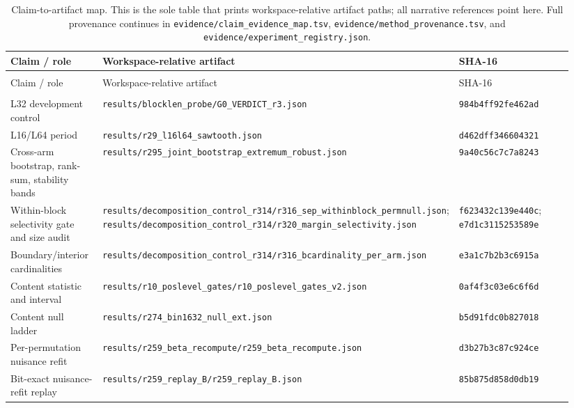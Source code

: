 \documentclass{article}
\newcommand{\ap}[1]{\nolinkurl{#1}}
\begin{document}
\begingroup
\footnotesize
\setlength{\tabcolsep}{2pt}
\setlength{\LTpre}{3pt}
\setlength{\LTpost}{6pt}
\FloatBarrier
\begin{longtable}{@{}>{\raggedright\arraybackslash}p{0.17\linewidth}
                       >{\raggedright\arraybackslash}p{0.53\linewidth}
                       >{\raggedright\arraybackslash}p{0.24\linewidth}@{}}
\caption{Claim-to-artifact map. This is the sole table that prints
workspace-relative artifact paths; all narrative references point here. Full
provenance continues in \ap{evidence/claim_evidence_map.tsv},
\ap{evidence/method_provenance.tsv}, and
\ap{evidence/experiment_registry.json}.}\label{tab:artifacts}\\
\toprule
Claim / role & Workspace-relative artifact & SHA-16 \\
\midrule
\endfirsthead
\multicolumn{3}{@{}l}{\footnotesize\itshape Table~\thetable{} continued}\\
\toprule
Claim / role & Workspace-relative artifact & SHA-16 \\
\midrule
\endhead
\midrule
\multicolumn{3}{r@{}}{\footnotesize\itshape Continued on next page}\\
\endfoot
\bottomrule
\endlastfoot
L32 development control & \ap{results/blocklen_probe/G0_VERDICT_r3.json} & \ap{984b4ff92fe462ad} \\
L16/L64 period & \ap{results/r29_l16l64_sawtooth.json} & \ap{d462dff346604321} \\
Cross-arm bootstrap, rank-sum, stability bands & \ap{results/r295_joint_bootstrap_extremum_robust.json} & \ap{9a40c56c7c7a8243} \\
Within-block selectivity gate and size audit & \ap{results/decomposition_control_r314/r316_sep_withinblock_permnull.json}; \ap{results/decomposition_control_r314/r320_margin_selectivity.json} & \ap{f623432c139e440c}; \ap{e7d1c3115253589e} \\
Boundary/interior cardinalities & \ap{results/decomposition_control_r314/r316_bcardinality_per_arm.json} & \ap{e3a1c7b2b3c6915a} \\
Content statistic and interval & \ap{results/r10_poslevel_gates/r10_poslevel_gates_v2.json} & \ap{0af4f3c03e6c6f6d} \\
Content null ladder & \ap{results/r274_bin1632_null_ext.json} & \ap{b5d91fdc0b827018} \\
Per-permutation nuisance refit & \ap{results/r259_beta_recompute/r259_beta_recompute.json} & \ap{d3b27b3c87c924ce} \\
Bit-exact nuisance-refit replay & \ap{results/r259_replay_B/r259_replay_B.json} & \ap{85b875d858d0db19} \\

\end{longtable}
\end{document}
